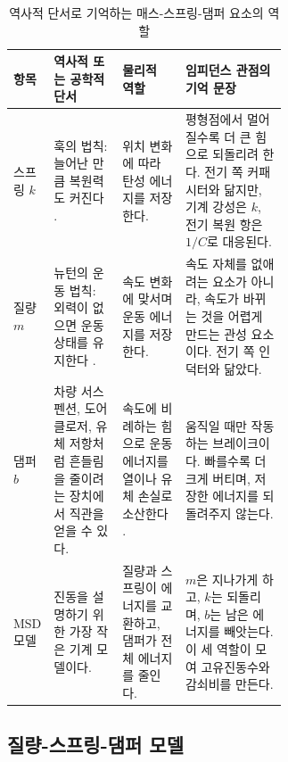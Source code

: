 \begin{table}[!htbp]
  \centering
  \caption{역사적 단서로 기억하는 매스-스프링-댐퍼 요소의 역할}
  \small
  \setlength{\tabcolsep}{3pt}
  \begin{tabularx}{\linewidth}{@{}>{\raggedright\arraybackslash}p{0.13\linewidth}>{\raggedright\arraybackslash}p{0.25\linewidth}>{\raggedright\arraybackslash}p{0.23\linewidth}>{\raggedright\arraybackslash}X@{}}
    \toprule
    항목 & 역사적 또는 공학적 단서 & 물리적 역할 & 임피던스 관점의 기억 문장 \\
    \midrule
    스프링 $k$ & 훅의 법칙: 늘어난 만큼 복원력도 커진다 \cite{hooke1678depotentiarestitutiva}. & 위치 변화에 따라 탄성 에너지를 저장한다. & 평형점에서 멀어질수록 더 큰 힘으로 되돌리려 한다. 전기 쪽 커패시터와 닮지만, 기계 강성은 $k$, 전기 복원 항은 $1/C$로 대응된다. \\
    질량 $m$ & 뉴턴의 운동 법칙: 외력이 없으면 운동 상태를 유지한다 \cite{newton1687principia}. & 속도 변화에 맞서며 운동 에너지를 저장한다. & 속도 자체를 없애려는 요소가 아니라, 속도가 바뀌는 것을 어렵게 만드는 관성 요소이다. 전기 쪽 인덕터와 닮았다. \\
    댐퍼 $b$ & 차량 서스펜션, 도어 클로저, 유체 저항처럼 흔들림을 줄이려는 장치에서 직관을 얻을 수 있다. & 속도에 비례하는 힘으로 운동 에너지를 열이나 유체 손실로 소산한다 \cite{libretexts_viscous_damping}. & 움직일 때만 작동하는 브레이크이다. 빠를수록 더 크게 버티며, 저장한 에너지를 되돌려주지 않는다. \\
    MSD 모델 & 진동을 설명하기 위한 가장 작은 기계 모델이다. & 질량과 스프링이 에너지를 교환하고, 댐퍼가 전체 에너지를 줄인다. & $m$은 지나가게 하고, $k$는 되돌리며, $b$는 남은 에너지를 빼앗는다. 이 세 역할이 모여 고유진동수와 감쇠비를 만든다. \\
    \bottomrule
  \end{tabularx}
  \label{tab:msd-history-role}
\end{table}

\subsection{질량-스프링-댐퍼 모델}

